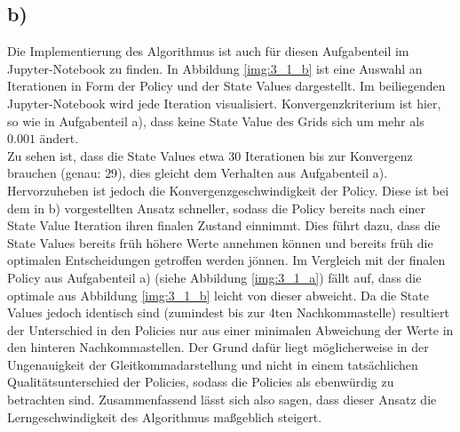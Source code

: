 \documentclass[11pt]{article}
\begin{document}
\subsection*{b)}
Die Implementierung des Algorithmus ist auch für diesen Aufgabenteil im Jupyter-Notebook zu finden. In Abbildung \ref{img:3_1_b} ist eine Auswahl an Iterationen in Form der Policy und der State Values dargestellt. Im beiliegenden Jupyter-Notebook wird jede Iteration visualisiert. Konvergenzkriterium ist hier, so wie in Aufgabenteil a), dass keine State Value des Grids sich um mehr als $0.001$ ändert.\\
Zu sehen ist, dass die State Values etwa $30$ Iterationen bis zur Konvergenz brauchen (genau: $29$), dies gleicht dem Verhalten aus Aufgabenteil a). Hervorzuheben ist jedoch die Konvergenzgeschwindigkeit der Policy. Diese ist bei dem in b) vorgestellten Ansatz schneller, sodass die Policy bereits nach einer State Value Iteration ihren finalen Zustand einnimmt. Dies führt dazu, dass die State Values bereits früh höhere Werte annehmen können und bereits früh die optimalen Entscheidungen getroffen werden jönnen.
Im Vergleich mit der finalen Policy aus Aufgabenteil a) (siehe Abbildung \ref{img:3_1_a}) fällt auf, dass die optimale aus Abbildung \ref{img:3_1_b} leicht von dieser abweicht. Da die State Values jedoch identisch sind (zumindest bis zur 4ten Nachkommastelle) resultiert der Unterschied in den Policies nur aus einer minimalen Abweichung der Werte in den hinteren Nachkommastellen. Der Grund dafür liegt möglicherweise in der Ungenauigkeit der Gleitkommadarstellung und nicht in einem tatsächlichen Qualitätsunterschied der Policies, sodass die Policies als ebenwürdig zu betrachten sind.
Zusammenfassend lässt sich also sagen, dass dieser Ansatz die Lerngeschwindigkeit des Algorithmus maßgeblich steigert.
\end{document}
